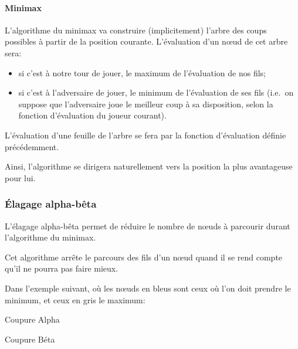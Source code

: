 \paragraph{Minimax}
L'algorithme du minimax va construire (implicitement) l'arbre des coups
possibles à partir de la position courante.
L'évaluation d'un nœud de cet arbre sera:
\begin{itemize}
  \item si c'est à notre tour de jouer, le maximum de l'évaluation de nos fils;
  \item si c'est à l'adversaire de jouer, le minimum de l'évaluation
    de ses fils (i.e.\ on suppose que l'adversaire joue le meilleur
    coup à sa disposition, selon la fonction d'évaluation du joueur courant).
\end{itemize}

L'évaluation d'une feuille de l'arbre se fera par la fonction
d'évaluation définie précédemment.

Ainsi, l'algorithme se dirigera naturellement vers la position la plus
avantageuse pour lui.

\subsubsection{Élagage alpha-bêta}
L'élagage alpha-bêta permet de réduire le nombre de nœuds à parcourir durant
l'algorithme du minimax.

Cet algorithme arrête le parcours des fils d'un nœud quand il se rend
compte qu'il ne pourra pas faire mieux.

Dans l'exemple suivant, où les nœuds en bleus sont ceux où l'on doit prendre
le minimum, et ceux en gris le maximum:
\begin{multicols}{2}\begin{center}

  Coupure Alpha


  Coupure Béta
\end{center}\end{multicols}

